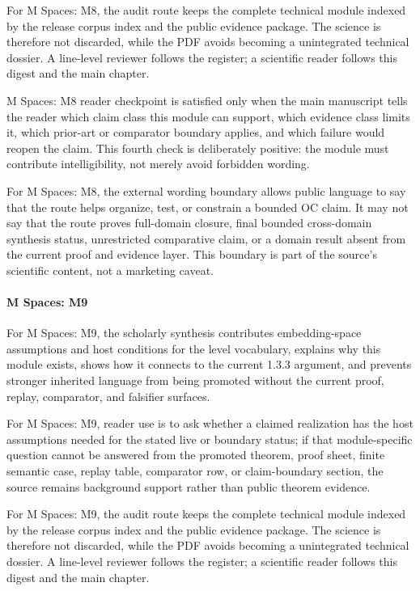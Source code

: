 For M Spaces: M8, the audit route keeps the complete technical module indexed by the release corpus index and the public evidence package. The science is therefore not discarded, while the PDF avoids becoming a unintegrated technical dossier. A line-level reviewer follows the register; a scientific reader follows this digest and the main chapter.


M Spaces: M8 reader checkpoint is satisfied only when the main manuscript tells the reader which claim class this module can support, which evidence class limits it, which prior-art or comparator boundary applies, and which failure would reopen the claim. This fourth check is deliberately positive: the module must contribute intelligibility, not merely avoid forbidden wording.


For M Spaces: M8, the external wording boundary allows public language to say that the route helps organize, test, or constrain a bounded OC claim. It may not say that the route proves full-domain closure, final bounded cross-domain synthesis status, unrestricted comparative claim, or a domain result absent from the current proof and evidence layer. This boundary is part of the source's scientific content, not a marketing caveat.


\paragraph{M Spaces: M9}

For M Spaces: M9, the scholarly synthesis contributes embedding-space assumptions and host conditions for the level vocabulary, explains why this module exists, shows how it connects to the current 1.3.3 argument, and prevents stronger inherited language from being promoted without the current proof, replay, comparator, and falsifier surfaces.


For M Spaces: M9, reader use is to ask whether a claimed realization has the host assumptions needed for the stated live or boundary status; if that module-specific question cannot be answered from the promoted theorem, proof sheet, finite semantic case, replay table, comparator row, or claim-boundary section, the source remains background support rather than public theorem evidence.


For M Spaces: M9, the audit route keeps the complete technical module indexed by the release corpus index and the public evidence package. The science is therefore not discarded, while the PDF avoids becoming a unintegrated technical dossier. A line-level reviewer follows the register; a scientific reader follows this digest and the main chapter.


